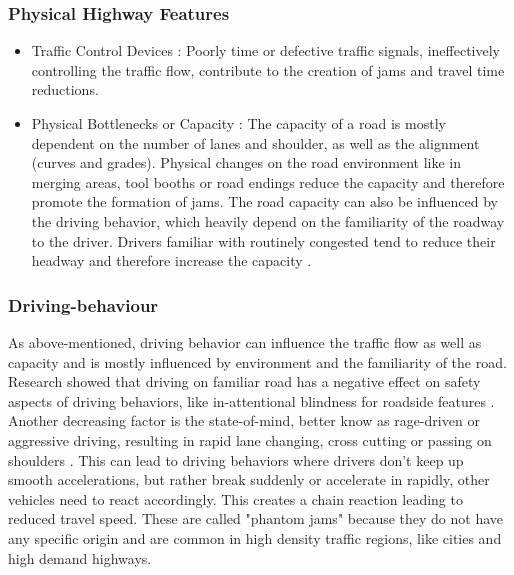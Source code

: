 \documentclass[a4paper,12pt]{report}
\begin{document}
\subsubsection{Physical Highway Features}

\begin{itemize}
	\item Traffic Control Devices : Poorly time or defective traffic signals, ineffectively controlling the traffic flow, contribute to the creation of jams and travel time reductions.
	\item Physical Bottlenecks or Capacity : The capacity of a road is mostly dependent on the number of lanes and shoulder, as well as the alignment (curves and grades). Physical changes on the road environment like in merging areas, tool booths or road endings reduce the capacity and therefore promote the formation of jams. The road capacity can also be influenced by the driving behavior, which heavily depend on the familiarity of the roadway to the driver. Drivers familiar with routinely congested tend to reduce their headway and therefore increase the capacity \cite{Charlton2013}.
\end{itemize}

\subsubsection{Driving-behaviour}
As above-mentioned, driving behavior can influence the traffic flow as well as capacity and is mostly influenced by environment and the familiarity of the road. Research showed that driving on familiar road has a negative effect on safety aspects of driving behaviors, like in-attentional blindness for roadside features \cite{Charlton2013}. Another decreasing factor is the state-of-mind, better know as rage-driven or aggressive driving, resulting in rapid lane changing, cross cutting or passing on shoulders \cite{Shinar2004}. This can lead to driving behaviors where drivers don't keep up smooth accelerations, but rather break suddenly or accelerate in rapidly, other vehicles need to react accordingly. This creates a chain reaction leading to reduced travel speed. These are called "phantom jams" because they do not have any specific origin and are common in high density traffic regions, like cities and high demand highways. \cite{ASTRA2020} 

\bigskip
\end{document}
